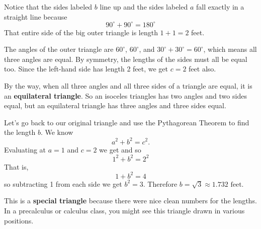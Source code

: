 Notice that the sides labeled $b$ line up and the sides labeled $a$ fall exactly in a straight line because $$90^\circ + 90^\circ = 180^\circ$$ That entire side of the big outer triangle is length $1+1=2$ feet.

The angles of the outer triangle are $60^\circ$, $60^\circ$, and $30^\circ + 30^\circ=60^\circ$, which means all three angles are equal.  By symmetry, the lengths of the sides must all be equal too.   Since the left-hand side has length 2 feet, we get $c=2$ feet also.

By the way, when all three angles and all three sides of a triangle are equal, it is an \textbf{equilateral triangle}. So an isoceles triangles has two angles and two sides equal, but an equilateral triangle has three angles and three sides equal.

Let's go back to our original triangle and use the Pythagorean Theorem to find the length $b$.  We know
$$a^2 + b^2 = c^2.$$
Evaluating at $a=1$ and $c=2$ we get
and so $$1^2 + b^2 = 2^2$$  That is,
$$1 + b^2 = 4$$
so subtracting 1 from each side we get
$b^2 = 3$.  Therefore $b = \sqrt{3} \approx 1.732 \text{ feet}$.

\begin{center}
\end{center}

This is a \textbf{special triangle} because there were nice clean numbers for the lengths.  In a precalculus or calculus class, you might see this triangle drawn in various positions. 

